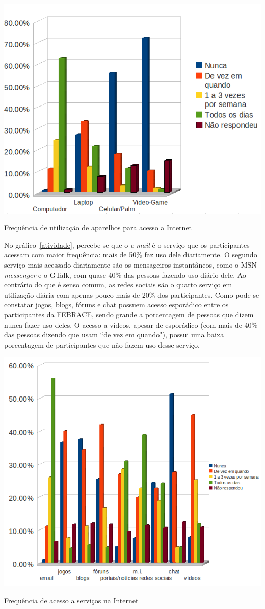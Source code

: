     \begin{grafico}
        \begin{center}
    \includegraphics[width=0.7\linewidth]{arquivos/dispositivo.png}
        \end{center}
        \caption{Frequência de utilização de aparelhos para acesso a Internet}
        \label{dispositivo}
    \end{grafico}

    No gráfico~\ref{atividade}, percebe-se que o \textit{e-mail} é o serviço que os participantes acessam com maior frequência: mais de 50\% faz uso dele diariamente. O segundo serviço mais acessado diariamente são os mensageiros instantâneos, como o MSN \textit{messenger} e o GTalk, com quase 40\%  das pessoas fazendo uso diário dele. Ao contrário do que é senso comum, as redes sociais são o quarto serviço em utilização diária com apenas pouco mais de 20\% dos participantes. Como pode-se constatar jogos, blogs, fóruns e chat possuem acesso esporádico entre os participantes da FEBRACE, sendo grande a porcentagem de pessoas que dizem nunca fazer uso deles. O acesso a vídeos, apesar de esporádico (com mais de 40\% das pessoas dizendo que usam “de vez em quando"), possui uma baixa porcentagem de participantes que não fazem uso desse serviço.

    \begin{grafico}
        \begin{center}
    \includegraphics[width=0.7\linewidth]{arquivos/atividade.png}
        \end{center}
        \caption{Frequência de acesso a serviços na Internet}
        \label{atividade}
    \end{grafico}

